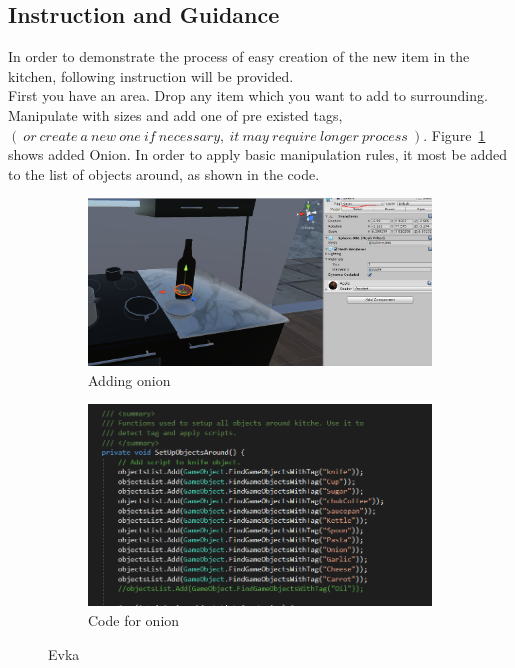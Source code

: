 \documentclass[18pt]{article}
\numberwithin{equation}{section} %
\numberwithin{figure}{section} %
\numberwithin{table}{section} %
\begin{document}
	\subsection{Instruction and Guidance}	
		In order to demonstrate the process of easy creation of the new item in the kitchen, following instruction will be provided.\\
		
		First you have an area. Drop any item which you want to add to surrounding. Manipulate with sizes and add one of pre existed tags, $\left(\ or\ create\ a\ new\ one\ if\ necessary,\ it\ may\ require\ longer\ process\  \right) . $ Figure~\ref{fig:add_object} shows added Onion. In order to apply basic manipulation rules, it most be added to the list of objects around, as shown in the code. \\
		
		\begin{figure}[H]
			\centering
			\begin{subfigure}{0.45\textwidth}
				\centering
				\includegraphics[width=1\linewidth]{images/add_onion}
				\caption{Adding onion}
			\end{subfigure}
			\begin{subfigure}{0.45\textwidth}
				\centering
				\includegraphics[width=0.85\linewidth]{images/add_onion_code}
				\caption{Code for onion}
			\end{subfigure}		
			\caption{Evka}
			\label{fig:add_object}
		\end{figure}
		
\end{document}

